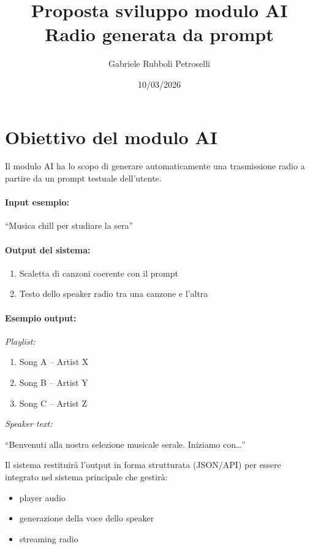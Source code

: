 \documentclass[11pt,a4paper]{article}
\title{\textbf{Proposta sviluppo modulo AI} \\ \Large Radio generata da prompt}
\author{Gabriele Rubboli Petroselli}
\date{10/03/2026}
\begin{document}
\maketitle
\vspace{1.5cm}

\section{Obiettivo del modulo AI}

Il modulo AI ha lo scopo di generare automaticamente una trasmissione radio a partire da un prompt testuale dell'utente.

\paragraph{Input esempio:}
``Musica chill per studiare la sera''

\paragraph{Output del sistema:}
\begin{enumerate}
    \item Scaletta di canzoni coerente con il prompt
    \item Testo dello speaker radio tra una canzone e l'altra
\end{enumerate}

\paragraph{Esempio output:}
\textit{Playlist:}
\begin{enumerate}
    \item Song A -- Artist X
    \item Song B -- Artist Y
    \item Song C -- Artist Z
\end{enumerate}

\textit{Speaker text:}

``Benvenuti alla nostra selezione musicale serale. Iniziamo con\dots''

\vspace{0.5cm}
Il sistema restituirà l'output in forma strutturata (JSON/API) per essere integrato nel sistema principale che gestirà:
\begin{itemize}
    \item player audio
    \item generazione della voce dello speaker
    \item streaming radio
\end{itemize}
\end{document}
